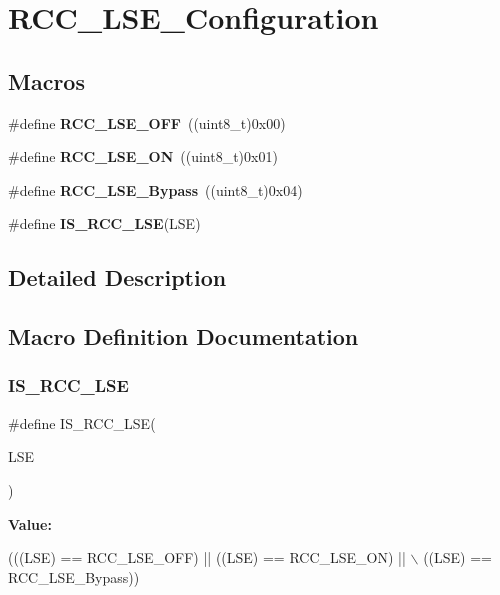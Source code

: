 \section{R\+C\+C\+\_\+\+L\+S\+E\+\_\+\+Configuration}
\label{group__RCC__LSE__Configuration}
\subsection*{Macros}
\begin{DoxyCompactItemize}
\item 
\#define \textbf{ R\+C\+C\+\_\+\+L\+S\+E\+\_\+\+O\+FF}~((uint8\+\_\+t)0x00)
\item 
\#define \textbf{ R\+C\+C\+\_\+\+L\+S\+E\+\_\+\+ON}~((uint8\+\_\+t)0x01)
\item 
\#define \textbf{ R\+C\+C\+\_\+\+L\+S\+E\+\_\+\+Bypass}~((uint8\+\_\+t)0x04)
\item 
\#define \textbf{ I\+S\+\_\+\+R\+C\+C\+\_\+\+L\+SE}(L\+SE)
\end{DoxyCompactItemize}


\subsection{Detailed Description}


\subsection{Macro Definition Documentation}
\mbox{\label{group__RCC__LSE__Configuration_ga95d2678bf8f46e932e7cba75619a4d2c}} 
\subsubsection{I\+S\+\_\+\+R\+C\+C\+\_\+\+L\+SE}
{\footnotesize\ttfamily \#define I\+S\+\_\+\+R\+C\+C\+\_\+\+L\+SE(\begin{DoxyParamCaption}\item[{}]{L\+SE }\end{DoxyParamCaption})}

{\bfseries Value\+:}
\begin{DoxyCode}
(((LSE) == RCC_LSE_OFF) || ((LSE) == RCC_LSE_ON) || \(\backslash\)
                         ((LSE) == RCC_LSE_Bypass))
\end{DoxyCode}


